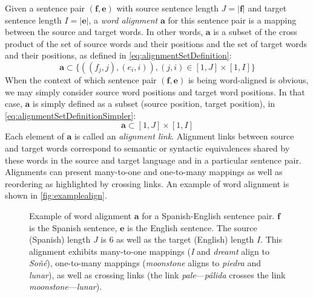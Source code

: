 Given a sentence pair $(\bm{f}, \bm{e})$ with source sentence
length $J = |\bm{f}|$ and target sentence
length $I = |\bm{e}|$, a \emph{word alignment} $\bm{a}$
for this sentence pair is a mapping between the source and target
words. In other words, $\bm{a}$ is a subset of the cross product
of the set of source words and their positions and the set of target
words and their positions, as defined in \autoref{eq:alignmentSetDefinition}:
%
\begin{equation}
  \bm{a} \subset \{((f_j, j), (e_i, i)), (j, i) \in [1, J] \times [1, I]\}
  \label{eq:alignmentSetDefinition}
\end{equation}
%
When the context of which sentence pair $(\bm{f}, \bm{e})$ is
being word-aligned is obvious, we may simply consider source word positions
and target word positions. In that case, $\bm{a}$ is simply defined
as a subset (source position, target position), in
\autoref{eq:alignmentSetDefinitionSimpler}:
%
\begin{equation}
  \bm{a} \subset [1, J] \times [1, I]
  \label{eq:alignmentSetDefinitionSimpler}
\end{equation}
%
Each element of $\bm{a}$ is called an \emph{alignment link}.
Alignment links between source and target words
correspond to semantic or syntactic equivalences shared by these words in the
source and target language and in a particular
sentence pair. Alignments can present many-to-one and one-to-many
mappings as well as reordering as highlighted by crossing links. An example
of word alignment is
shown in \autoref{fig:examplealign}.
%
\begin{figure}
  \begin{center}
  \end{center}
  \caption{Example of word alignment $\bm{a}$ for a Spanish-English sentence pair.
    $\bm{f}$ is the Spanish sentence, $\bm{e}$ is the English sentence.
    The source (Spanish)
    length $J$ is 6 as well as the target (English) length $I$. This alignment
    exhibits many-to-one mappings (\emph{I} and \emph{dreamt} align
    to \emph{Soñé}), one-to-many mappings (\emph{moonstone} aligns
    to \emph{piedra} and \emph{lunar}), as well as crossing links
    (the link \emph{pale}---\emph{pálida} crosses the
    link \emph{moonstone}---\emph{lunar}).}
  \label{fig:examplealign}
\end{figure}
